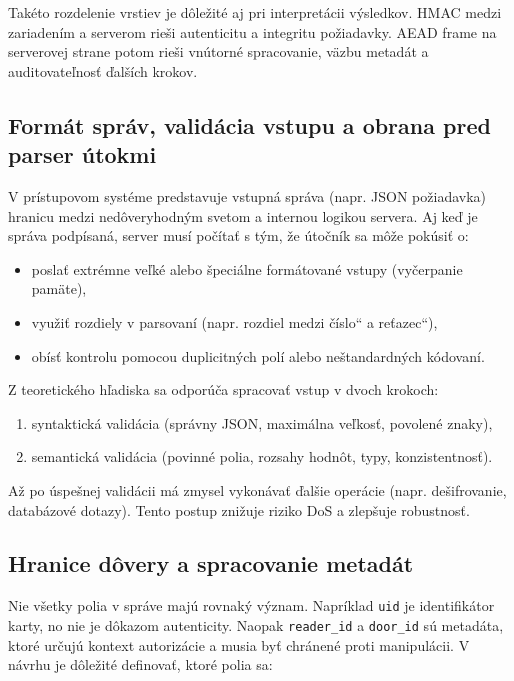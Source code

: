 \documentclass[journal,a4paper,onecolumn]{IEEEtran}
\newcommand{\uv}[1]{\quotedblbase#1\textquotedblleft}
\begin{document}
Takéto rozdelenie vrstiev je dôležité aj pri interpretácii výsledkov. HMAC medzi zariadením a serverom rieši autenticitu a integritu požiadavky. AEAD frame na serverovej strane potom rieši vnútorné spracovanie, väzbu metadát a auditovateľnosť ďalších krokov.

\subsection{Formát správ, validácia vstupu a obrana pred parser útokmi}

V prístupovom systéme predstavuje vstupná správa (napr. JSON požiadavka) hranicu medzi nedôveryhodným svetom a internou logikou servera. Aj keď je správa podpísaná, server musí počítať s tým, že útočník sa môže pokúsiť o:

\begin{itemize}[leftmargin=*,itemsep=2pt]
  \item poslať extrémne veľké alebo špeciálne formátované vstupy (vyčerpanie pamäte),
  \item využiť rozdiely v parsovaní (napr. rozdiel medzi \uv{číslo} a \uv{reťazec}),
  \item obísť kontrolu pomocou duplicitných polí alebo neštandardných kódovaní.
\end{itemize}

Z teoretického hľadiska sa odporúča spracovať vstup v dvoch krokoch:

\begin{enumerate}[leftmargin=*,itemsep=2pt]
  \item syntaktická validácia (správny JSON, maximálna veľkosť, povolené znaky),
  \item semantická validácia (povinné polia, rozsahy hodnôt, typy, konzistentnosť).
\end{enumerate}

Až po úspešnej validácii má zmysel vykonávať ďalšie operácie (napr. dešifrovanie, databázové dotazy). Tento postup znižuje riziko DoS a zlepšuje robustnosť.

\subsection{Hranice dôvery a spracovanie metadát}

Nie všetky polia v správe majú rovnaký význam. Napríklad \texttt{uid} je identifikátor karty, no nie je dôkazom autenticity. Naopak \texttt{reader\_id} a \texttt{door\_id} sú metadáta, ktoré určujú kontext autorizácie a musia byť chránené proti manipulácii. V návrhu je dôležité definovať, ktoré polia sa:
\end{document}
